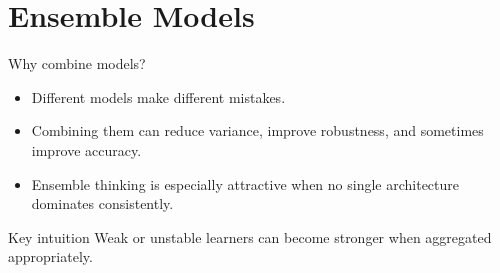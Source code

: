 \documentclass[12pt]{beamer}
\begin{document}
\section{Ensemble Models}

\begin{frame}{Why combine models?}
  \begin{itemize}
    \item Different models make different mistakes.
    \item Combining them can reduce variance, improve robustness, and sometimes improve accuracy.
    \item Ensemble thinking is especially attractive when no single architecture dominates consistently.
  \end{itemize}
  \begin{conceptbox}{Key intuition}
    Weak or unstable learners can become stronger when aggregated appropriately.
  \end{conceptbox}
\end{frame}
\end{document}
